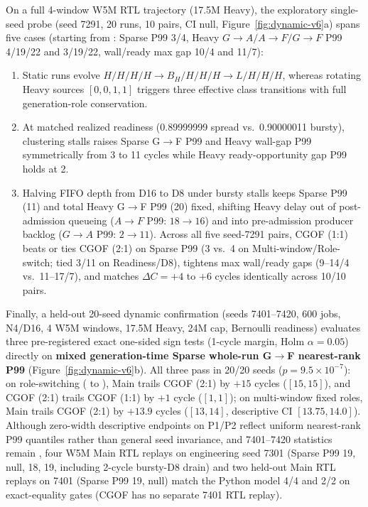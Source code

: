 On a full 4-window W5M RTL trajectory (17.5M Heavy), the exploratory single-seed probe (seed 7291, 20 runs, 10 pairs, CI null, Figure~\ref{fig:dynamic-v6}a) spans five cases (starting from : Sparse P99 3/4, Heavy $G\rightarrow A/A\rightarrow F/G\rightarrow F$ P99 4/19/22 and 3/19/22, wall/ready max gap 10/4 and 11/7):
\begin{enumerate}
\item Static runs evolve $H/\allowbreak H/\allowbreak H/\allowbreak H \rightarrow \allowbreak B_H/\allowbreak H/\allowbreak H/\allowbreak H \rightarrow \allowbreak L/\allowbreak H/\allowbreak H/\allowbreak H$, whereas rotating Heavy sources $[0,0,1,1]$ triggers three effective class transitions with full generation-role conservation.
\item At matched realized readiness (0.89999999 spread vs.\ 0.90000011 bursty), clustering stalls raises Sparse G$\rightarrow$F P99 and Heavy wall-gap P99 symmetrically from 3 to 11 cycles while Heavy ready-opportunity gap P99 holds at 2.
\item Halving FIFO depth from D16 to D8 under bursty stalls keeps Sparse P99 (11) and total Heavy G$\rightarrow$F P99 (20) fixed, shifting Heavy delay out of post-admission queueing ($A\rightarrow F$ P99: $18\rightarrow 16$) and into pre-admission producer backlog ($G\rightarrow A$ P99: $2\rightarrow 11$). Across all five seed-7291 pairs, CGOF (1:1) beats or ties CGOF (2:1) on Sparse P99 (3 vs.\ 4 on Multi-window/Role-switch; tied 3/11 on Readiness/D8), tightens max wall/ready gaps (9--14/4 vs.\ 11--17/7), and matches $\Delta C=+4$ to $+6$ cycles identically across 10/10 pairs.
\end{enumerate}

Finally, a held-out 20-seed dynamic confirmation (seeds 7401--7420, 600  jobs, N4/D16, 4 W5M windows, 17.5M Heavy, 24M cap, Bernoulli readiness) evaluates three pre-registered exact one-sided sign tests (1-cycle margin, Holm $\alpha=0.05$) directly on \textbf{mixed generation-time Sparse whole-run G$\rightarrow$F nearest-rank P99} (Figure~\ref{fig:dynamic-v6}b). All three pass in 20/20 seeds ($p=9.5\times 10^{-7}$): on role-switching ( to ), Main trails CGOF (2:1) by $+15$ cycles ($[15,15]$), and CGOF (2:1) trails CGOF (1:1) by $+1$ cycle ($[1,1]$); on multi-window fixed roles, Main trails CGOF (2:1) by $+13.9$ cycles ($[13, 14]$, descriptive CI $[13.75, 14.0]$). Although zero-width descriptive endpoints on P1/P2 reflect uniform nearest-rank P99 quantiles rather than general seed invariance, and 7401--7420 statistics remain , four W5M Main RTL replays on engineering seed 7301 (Sparse P99 19, null, 18, 19, including 2-cycle bursty-D8 drain) and two held-out Main RTL replays on 7401 (Sparse P99 19, null) match the Python model 4/4 and 2/2 on exact-equality gates (CGOF has no separate 7401 RTL replay).

